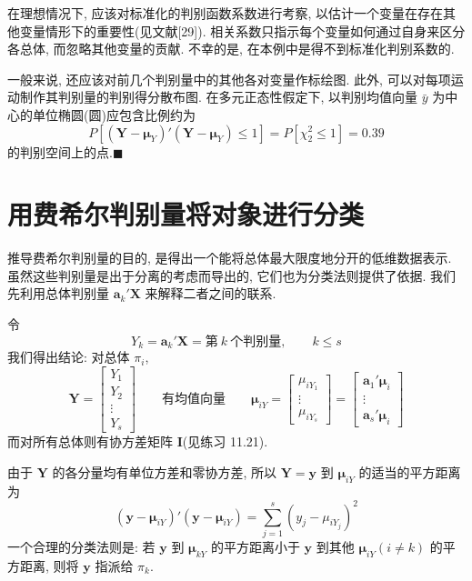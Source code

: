 
在理想情况下, 应该对标准化的判别函数系数进行考察, 以估计一个变量在存在其他变量情形下的重要性(见文献[29]). 相关系数只指示每个变量如何通过自身来区分各总体, 而忽略其他变量的贡献. 不幸的是, 在本例中是得不到标准化判别系数的.

一般来说, 还应该对前几个判别量中的其他各对变量作标绘图. 此外, 可以对每项运动制作其判别量的判别得分散布图. 在多元正态性假定下, 以判别均值向量 $\bar{y}$ 为中心的单位椭圆(圆)应包含比例约为
\[
P[(\mathbf{Y}-\boldsymbol{\mu}_Y)'(\mathbf{Y}-\boldsymbol{\mu}_Y)\le 1]=P[\chi_2^2\le 1]=0.39
\]
的判别空间上的点.\hfill$\blacksquare$

\section{用费希尔判别量将对象进行分类}
\label{sec:11.7}

推导费希尔判别量的目的, 是得出一个能将总体最大限度地分开的低维数据表示. 虽然这些判别量是出于分离的考虑而导出的, 它们也为分类法则提供了依据. 我们先利用总体判别量 $\mathbf{a}_k'\mathbf{X}$ 来解释二者之间的联系.

令
\label{eq:11-64}
\begin{equation}
Y_k=\mathbf{a}_k'\mathbf{X}=\text{第}\ k\ \text{个判别量},\qquad k\le s
\tag{11-64}
\end{equation}
我们得出结论: 对总体 $\pi_i$,
\[
\mathbf{Y}=\begin{bmatrix}Y_1\\Y_2\\\vdots\\Y_s\end{bmatrix}
\qquad\text{有均值向量}\qquad
\boldsymbol{\mu}_{iY}=\begin{bmatrix}\mu_{iY_1}\\\vdots\\\mu_{iY_s}\end{bmatrix}=\begin{bmatrix}\mathbf{a}_1'\boldsymbol{\mu}_i\\\vdots\\\mathbf{a}_s'\boldsymbol{\mu}_i\end{bmatrix}
\]
而对所有总体则有协方差矩阵 $\mathbf{I}$(见练习 11.21).

由于 $\mathbf{Y}$ 的各分量均有单位方差和零协方差, 所以 $\mathbf{Y}=\mathbf{y}$ 到 $\boldsymbol{\mu}_{iY}$ 的适当的平方距离为
\[
(\mathbf{y}-\boldsymbol{\mu}_{iY})'(\mathbf{y}-\boldsymbol{\mu}_{iY})=\sum_{j=1}^{s}(y_j-\mu_{iY_j})^2
\]
一个合理的分类法则是: 若 $\mathbf{y}$ 到 $\boldsymbol{\mu}_{kY}$ 的平方距离小于 $\mathbf{y}$ 到其他 $\boldsymbol{\mu}_{iY}(i\ne k)$ 的平方距离, 则将 $\mathbf{y}$ 指派给 $\pi_k$.

